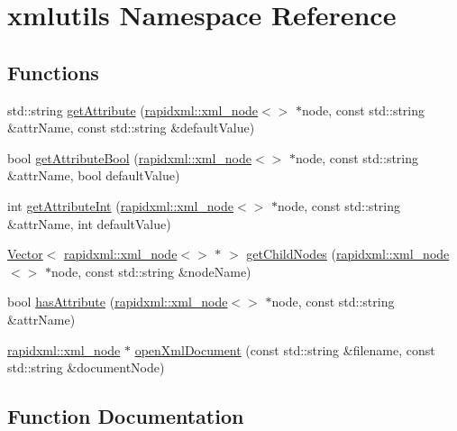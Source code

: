 \hypertarget{namespacexmlutils}{}\section{xmlutils Namespace Reference}
\label{namespacexmlutils}
\subsection*{Functions}
\begin{DoxyCompactItemize}
\item 
std\+::string \mbox{\hyperlink{namespacexmlutils_a68377575c0ba371e1221fceac39faf5f}{get\+Attribute}} (\mbox{\hyperlink{classrapidxml_1_1xml__node}{rapidxml\+::xml\+\_\+node}}$<$$>$ $\ast$node, const std\+::string \&attr\+Name, const std\+::string \&default\+Value)
\item 
bool \mbox{\hyperlink{namespacexmlutils_add5287d01ce8f47fbad34af589a3b52c}{get\+Attribute\+Bool}} (\mbox{\hyperlink{classrapidxml_1_1xml__node}{rapidxml\+::xml\+\_\+node}}$<$$>$ $\ast$node, const std\+::string \&attr\+Name, bool default\+Value)
\item 
int \mbox{\hyperlink{namespacexmlutils_aad19c1ecd2c1a058f7710f6d2246de87}{get\+Attribute\+Int}} (\mbox{\hyperlink{classrapidxml_1_1xml__node}{rapidxml\+::xml\+\_\+node}}$<$$>$ $\ast$node, const std\+::string \&attr\+Name, int default\+Value)
\item 
\mbox{\hyperlink{classVector}{Vector}}$<$ \mbox{\hyperlink{classrapidxml_1_1xml__node}{rapidxml\+::xml\+\_\+node}}$<$$>$ $\ast$ $>$ \mbox{\hyperlink{namespacexmlutils_a936753032a5a055762ced99c44aec6f8}{get\+Child\+Nodes}} (\mbox{\hyperlink{classrapidxml_1_1xml__node}{rapidxml\+::xml\+\_\+node}}$<$$>$ $\ast$node, const std\+::string \&node\+Name)
\item 
bool \mbox{\hyperlink{namespacexmlutils_ae8f64d4332fabd1d2a4b2f623522003b}{has\+Attribute}} (\mbox{\hyperlink{classrapidxml_1_1xml__node}{rapidxml\+::xml\+\_\+node}}$<$$>$ $\ast$node, const std\+::string \&attr\+Name)
\item 
\mbox{\hyperlink{classrapidxml_1_1xml__node}{rapidxml\+::xml\+\_\+node}} $\ast$ \mbox{\hyperlink{namespacexmlutils_a8b4e27a7832af00345b3c4909a09f5b7}{open\+Xml\+Document}} (const std\+::string \&filename, const std\+::string \&document\+Node)
\end{DoxyCompactItemize}


\subsection{Function Documentation}
\mbox{\label{namespacexmlutils_a68377575c0ba371e1221fceac39faf5f}} 
